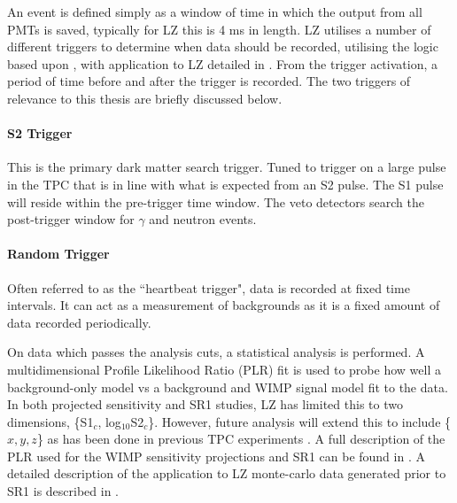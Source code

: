 \par
An event is defined simply as a window of time in which the output from all PMTs is saved, typically for LZ this is 4 ms in length.
LZ utilises a number of different triggers to determine when data should be recorded, utilising the logic based upon \cite{lux_trigger_logic_ref}, with application to LZ detailed in \cite{nicolasangelides_thesis_ref}.
From the trigger activation, a period of time before and after the trigger is recorded.
The two triggers of relevance to this thesis are briefly discussed below.

\paragraph{S2 Trigger}
\par
This is the primary dark matter search trigger.
Tuned to trigger on a large pulse in the TPC that is in line with what is expected from an S2 pulse.
The S1 pulse will reside within the pre-trigger time window.
The veto detectors search the post-trigger window for $\gamma$ and neutron events.

\paragraph{Random Trigger}
Often referred to as the ``heartbeat trigger", data is recorded at fixed time intervals.
It can act as a measurement of backgrounds as it is a fixed amount of data recorded periodically.

\par
On data which passes the analysis cuts, a statistical analysis is performed.
A multidimensional Profile Likelihood Ratio (PLR) fit is used to probe how well a background-only model vs a background and WIMP signal model fit to the data.
In both projected sensitivity and SR1 studies, LZ has limited this to two dimensions, \{S1$_c$, log$_{10}$S2$_c$\}.
However, future analysis will extend this to include \{$x,y,z$\} as has been done in previous TPC experiments \cite{LUX_RUN1_EFT_2021,LUX_RUN4_EFT_2021,shaunalsum_thesis_ref}.
A full description of the PLR used for the WIMP sensitivity projections and SR1 can be found in \cite{LZ_Ibles_LZStats_Thesis_ref}. 
A detailed description of the application to LZ monte-carlo data generated prior to SR1 is described in \cite{jonathannikoleyczik_thesis_ref}.

